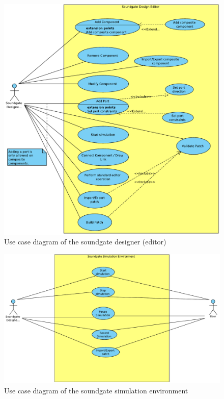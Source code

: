 	\begin{figure}[ht]
		\centering
			\includegraphics[width=\textwidth]{images/Soundgate_Designer.pdf}
		\caption{Use case diagram of the soundgate designer (editor)}
		\label{fig:Soundgate_Designer}
	\end{figure}
	
	\begin{figure}[ht]
		\centering
			\includegraphics[width=\textwidth]{images/Soundgate_Simulator.pdf}
		\caption{Use case diagram of the soundgate simulation environment}
		\label{fig:Soundgate_Simulator}
	\end{figure}
	
